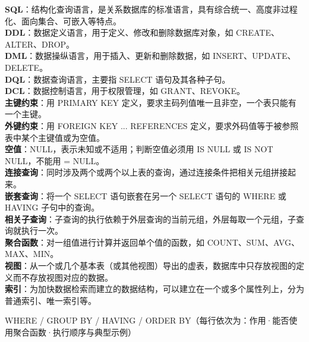 \documentclass[a4paper,11pt]{article}
\begin{document}
\begin{keyterms}
\textbf{SQL}：结构化查询语言，是关系数据库的标准语言，具有综合统一、高度非过程化、面向集合、可嵌入等特点。\\
\textbf{DDL}：数据定义语言，用于定义、修改和删除数据库对象，如 CREATE、ALTER、DROP。\\
\textbf{DML}：数据操纵语言，用于插入、更新和删除数据，如 INSERT、UPDATE、DELETE。\\
\textbf{DQL}：数据查询语言，主要指 SELECT 语句及其各种子句。\\
\textbf{DCL}：数据控制语言，用于权限管理，如 GRANT、REVOKE。\\
\textbf{主键约束}：用 PRIMARY KEY 定义，要求主码列值唯一且非空，一个表只能有一个主键。\\
\textbf{外键约束}：用 FOREIGN KEY ... REFERENCES 定义，要求外码值等于被参照表中某个主键值或为空值。\\
\textbf{空值}：NULL，表示未知或不适用；判断空值必须用 IS NULL 或 IS NOT NULL，不能用 = NULL。\\
\textbf{连接查询}：同时涉及两个或两个以上表的查询，通过连接条件把相关元组拼接起来。\\
\textbf{嵌套查询}：将一个 SELECT 语句嵌套在另一个 SELECT 语句的 WHERE 或 HAVING 子句中的查询。\\
\textbf{相关子查询}：子查询的执行依赖于外层查询的当前元组，外层每取一个元组，子查询就执行一次。\\
\textbf{聚合函数}：对一组值进行计算并返回单个值的函数，如 COUNT、SUM、AVG、MAX、MIN。\\
\textbf{视图}：从一个或几个基本表（或其他视图）导出的虚表，数据库中只存放视图的定义而不存放视图对应的数据。\\
\textbf{索引}：为加快数据检索而建立的数据结构，可以建立在一个或多个属性列上，分为普通索引、唯一索引等。
\end{keyterms}

\begin{contrast}{WHERE / GROUP BY / HAVING / ORDER BY（每行依次为：作用·能否使用聚合函数·执行顺序与典型示例）}
\end{contrast}
\end{document}

